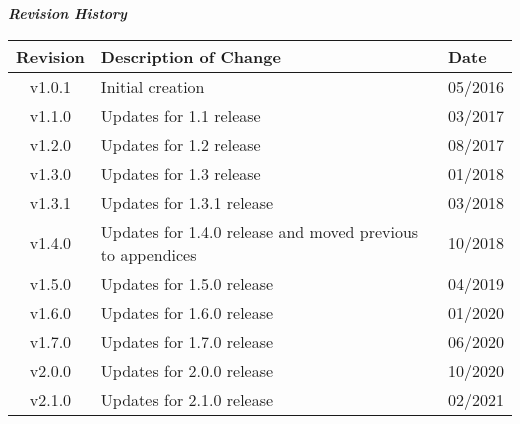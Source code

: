 \maketitle
\thispagestyle{empty}
\newpage

\begin{center}
	\textit{\textbf{Revision History}}
	\begin{table}[H]
		\label{table:revisions} %
		\begin{tabularx}{\textwidth}{|c|X|l|}
			\hline
			\rowcolor{blue}
			\textbf{Revision} & \textbf{Description of Change} & \textbf{Date} \\
		    \hline
			v1.0.1 & Initial creation & 05/2016 \\
			\hline
			v1.1.0 & Updates for 1.1 release & 03/2017 \\
			\hline
			v1.2.0 & Updates for 1.2 release & 08/2017 \\
			\hline
			v1.3.0 & Updates for 1.3 release & 01/2018 \\
			\hline
			v1.3.1 & Updates for 1.3.1 release & 03/2018 \\
			\hline
			v1.4.0 & Updates for 1.4.0 release and moved previous to appendices & 10/2018 \\
			\hline
			v1.5.0 & Updates for 1.5.0 release & 04/2019 \\
			\hline
			v1.6.0 & Updates for 1.6.0 release & 01/2020 \\
			\hline
			v1.7.0 & Updates for 1.7.0 release & 06/2020 \\
			\hline
			v2.0.0 & Updates for 2.0.0 release & 10/2020 \\
			\hline
			v2.1.0 & Updates for 2.1.0 release & 02/2021 \\
			\hline
		\end{tabularx}
	\end{table}
\end{center}
\newpage

\tableofcontents
\renewcommand\thesection{\Roman{section}}
\renewcommand\thesubsection{\thesection-\arabic{subsection}}
\newpage
{}

